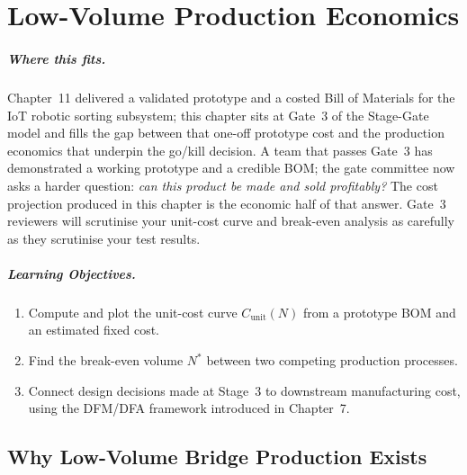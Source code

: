 
\chapter{Low-Volume Production Economics}
\label{ch:economics}

\paragraph{Where this fits.}
Chapter~11 delivered a validated prototype and a costed Bill of Materials for the IoT robotic sorting subsystem; this chapter sits at Gate~3 of the Stage-Gate model and fills the gap between that one-off prototype cost and the production economics that underpin the go/kill decision.
A team that passes Gate~3 has demonstrated a working prototype and a credible
BOM; the gate committee now asks a harder question: \emph{can this product be
made and sold profitably?}
The cost projection produced in this chapter is the economic half of that
answer.
Gate~3 reviewers will scrutinise your unit-cost curve and break-even analysis
as carefully as they scrutinise your test results.


\paragraph{Learning Objectives.}
\begin{enumerate}
  \item Compute and plot the unit-cost curve $C_{\text{unit}}(N)$ from a
        prototype BOM and an estimated fixed cost.
  \item Find the break-even volume $N^{*}$ between two competing production
        processes.
  \item Connect design decisions made at Stage~3 to downstream manufacturing
        cost, using the DFM/DFA framework introduced in Chapter~7.
\end{enumerate}

\section{Why Low-Volume Bridge Production Exists}
\label{sec:ch12-bridge}

